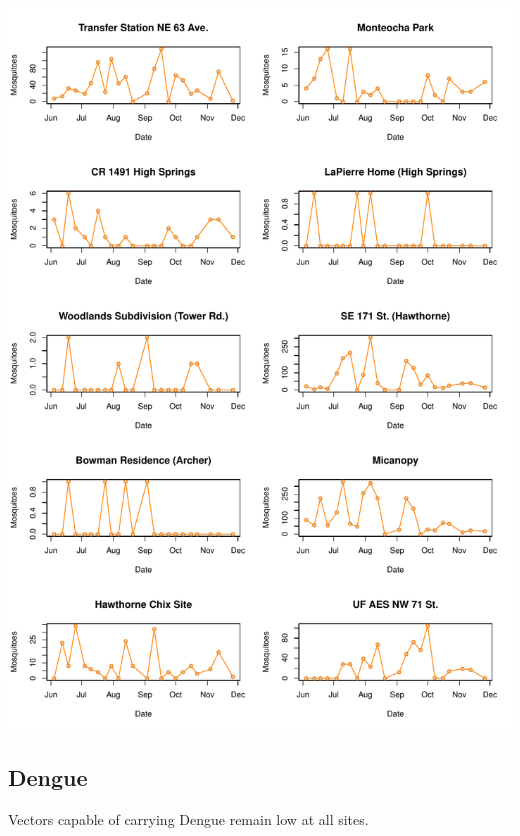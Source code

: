 \documentclass{article}
\begin{document}
\begin{center}
\includegraphics{mosq08nov13-012}
\newpage
\subsection*{Dengue}

\end{center}

Vectors capable of carrying Dengue remain low at all sites.\\
\end{document}
